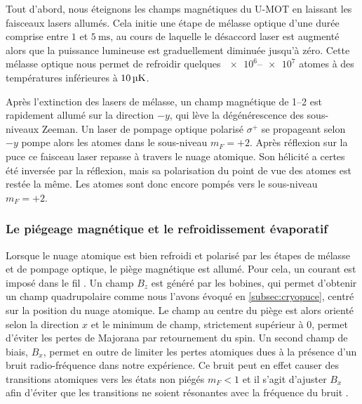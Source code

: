 Tout d'abord, nous éteignons les champs magnétiques du U-MOT en laissant les faisceaux lasers allumés.
Cela initie une étape de mélasse optique d'une durée comprise entre $\num{1}$ et $\SI{5}{\ms}$, au cours de laquelle le désaccord laser est augmenté alors que la puissance lumineuse est graduellement diminuée jusqu'à zéro.
Cette mélasse optique nous permet de refroidir quelques $\numrange{e6}{e7}$ atomes à des températures inférieures à $\SIvv{10}{\uK}$.

Après l'extinction des lasers de mélasse, un champ magnétique de \SIrange{1}{2}{\gauss} est rapidement allumé sur la direction $-y$, qui lève la dégénérescence des sous-niveaux Zeeman.
Un laser de pompage optique polarisé $\sigma ^+$ se propageant selon $-y$ pompe alors les atomes dans le sous-niveau $m_F=+2$.
Après réflexion sur la puce ce faisceau laser repasse à travers le nuage atomique.
Son hélicité a certes été inversée par la réflexion, mais sa polarisation du point de vue des atomes est restée la même.
Les atomes sont donc encore pompés vers le sous-niveau $m_F=+2$.

	\subsubsection*{Le piégeage magnétique et le refroidissement évaporatif}
\noindent Lorsque le nuage atomique est bien refroidi et polarisé par les étapes de mélasse et de pompage optique, le piège magnétique est allumé.
Pour cela, un courant est imposé dans le fil .
Un champ $B_z$ est généré par les bobines, qui permet d'obtenir un champ quadrupolaire comme nous l'avons évoqué en \ref{subsec:cryopuce}, centré sur la position du nuage atomique.
Le champ au centre du piège est alors orienté selon la direction $x$ et le minimum de champ, strictement supérieur à $0$, permet d'éviter les pertes de Majorana par retournement du spin.
Un second champ de biais, $B_x$, permet en outre de limiter les pertes atomiques dues à la présence d'un bruit radio-fréquence dans notre expérience.
Ce bruit peut en effet causer des transitions atomiques vers les états non piégés $m_F<1$ et il s'agit d'ajuster $B_x$ afin d'éviter que les transitions ne soient résonantes avec la fréquence du bruit \cite{PHD_NIRRENGARTEN}.

